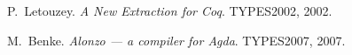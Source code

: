 \begin{thebibliography}{99}

   P.~Letouzey.
   \emph{A New Extraction for Coq}.
   TYPES2002, 2002.

   M.~Benke.
   \emph{Alonzo --- a compiler for Agda}.
   TYPES2007, 2007.

\end{thebibliography}

